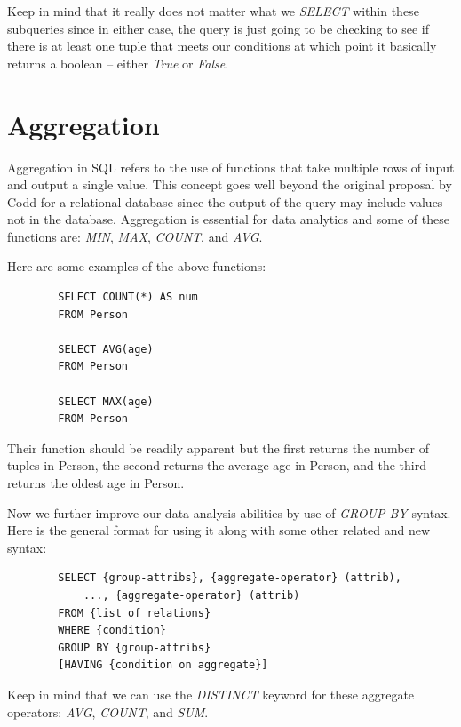 \documentclass{article}
\begin{document}
Keep in mind that it really does not matter what we \textit{SELECT} within these subqueries since in either case, the query is just going to be checking to see if there is at least one tuple that meets our conditions at which point it basically returns a boolean -- either \textit{True} or \textit{False}.

\section*{Aggregation}

Aggregation in SQL refers to the use of functions that take multiple rows of input and output a single value. This concept goes well beyond the original proposal by Codd for a relational database since the output of the query may include values not in the database. Aggregation is essential for data analytics and some of these functions are: \textit{MIN}, \textit{MAX}, \textit{COUNT}, and \textit{AVG}.

Here are some examples of the above functions:

\begin{tcolorbox}
    \begin{verbatim}
        SELECT COUNT(*) AS num
        FROM Person

        SELECT AVG(age)
        FROM Person

        SELECT MAX(age)
        FROM Person
    \end{verbatim}
\end{tcolorbox}

Their function should be readily apparent but the first returns the number of tuples in Person, the second returns the average age in Person, and the third returns the oldest age in Person.

Now we further improve our data analysis abilities by use of \textit{GROUP BY} syntax. Here is the general format for using it along with some other related and new syntax:

\begin{tcolorbox}
    \begin{verbatim}
        SELECT {group-attribs}, {aggregate-operator} (attrib),
            ..., {aggregate-operator} (attrib)
        FROM {list of relations}
        WHERE {condition}
        GROUP BY {group-attribs}
        [HAVING {condition on aggregate}]
    \end{verbatim}
\end{tcolorbox}

Keep in mind that we can use the \textit{DISTINCT} keyword for these aggregate operators: \textit{AVG}, \textit{COUNT}, and \textit{SUM}.
\end{document}
